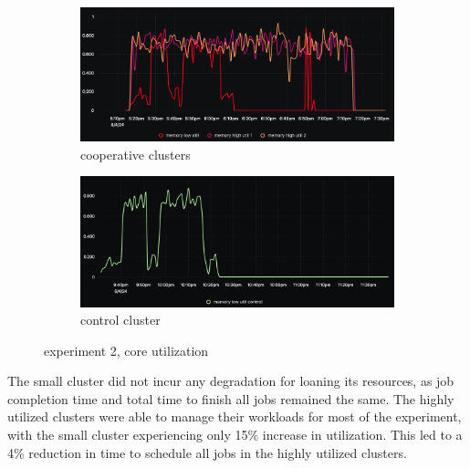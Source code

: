 \begin{figure}[H]
\centering
\begin{subfigure}{.5\textwidth}
  \centering
  \includegraphics[width=.9\linewidth]{./figures/experiment-three/cooperative.png}
  \caption{cooperative clusters}
  \label{fig:exp2coop}
\end{subfigure}%
\begin{subfigure}{.5\textwidth}
  \centering
  \includegraphics[width=.9\linewidth]{./figures/experiment-three/control.png}
  \caption{control cluster}
  \label{fig:exp2control}
\end{subfigure}
\caption{experiment 2, core utilization}
\label{fig:exp2coreutil}
\end{figure}

The small cluster did not incur any degradation for loaning its resources, as
job completion time and total time to finish all jobs remained the same. The
highly utilized clusters were able to manage their workloads for most of the
experiment, with the small cluster experiencing only 15\% increase in
utilization. This led to a  4\% reduction in time to schedule all jobs in the
highly utilized clusters. 



%
%
